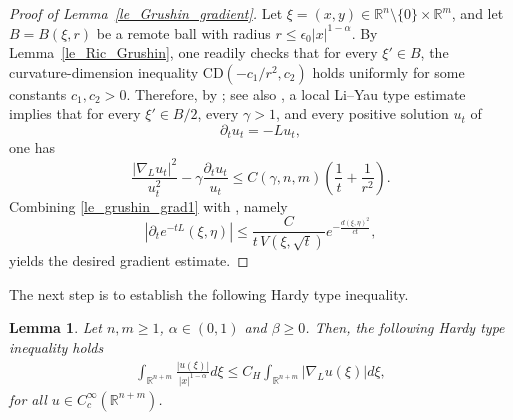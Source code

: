 \documentclass[12pt]{amsart}
\theoremstyle{plain}
\newtheorem{lemma}[theorem]{Lemma}
\theoremstyle{definition}
\numberwithin{equation}{section}
\begin{document}

\begin{proof}[Proof of Lemma~\ref{le_Grushin_gradient}]
Let \(\xi=(x,y)\in \mathbb{R}^n\setminus\{0\}\times \mathbb{R}^m\), and let \(B=B(\xi,r)\) be a remote ball with radius \(r\le \epsilon_0 |x|^{1-\alpha}\). By Lemma~\ref{le_Ric_Grushin}, one readily checks that for every \(\xi'\in B\), the curvature-dimension inequality \(\mathrm{CD}(-c_1/r^2,c_2)\) holds uniformly for some constants \(c_1,c_2>0\). Therefore, by \cite[Theorem~1.4]{ZZ}; see also \cite[Theorem~5.1]{XDL}, a local Li--Yau type estimate implies that for every \(\xi'\in B/2\), every \(\gamma>1\), and every positive solution \(u_t\) of
\[
\partial_t u_t=-Lu_t,
\]
one has
\begin{equation}\label{le_grushin_grad1}
    \frac{|\nabla_L u_t|^2}{u_t^2}-\gamma \frac{\partial_t u_t}{u_t}
    \le
    C(\gamma,n,m)\left(\frac{1}{t}+\frac{1}{r^2}\right).
\end{equation}
Combining \eqref{le_grushin_grad1} with \cite[Theorem~2.6]{Sturm3}, namely
\begin{equation}\label{le_grushin_grad2}
    \left| \partial_t e^{-tL}(\xi,\eta)\right|
    \le
    \frac{C}{t\,V(\xi,\sqrt t)}e^{-\frac{d(\xi,\eta)^2}{ct}},
\end{equation}
yields the desired gradient estimate.
\end{proof}







The next step is to establish the following Hardy type inequality.
\begin{lemma}\label{le_hardy}
Let $n, m\ge 1$, $\alpha \in (0,1)$ and $\beta \ge 0$. Then, the following Hardy type inequality holds
\begin{align}\label{eq_hardy}
    \int_{\mathbb{R}^{n+m}} \frac{|u(\xi)|}{|x|^{1-\alpha}} d\xi \le C_H \int_{\mathbb{R}^{n+m}} |\nabla_{L}u(\xi)| d\xi,
\end{align}
for all $u\in C_c^\infty(\mathbb{R}^{n+m})$.
\end{lemma}
\end{document}
